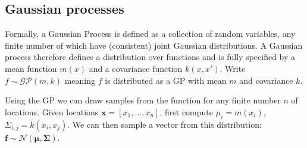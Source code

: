 \documentclass{article}
\begin{document}
\subsection{Gaussian processes}
Formally, a Gaussian Process is defined as a collection of random variables, any finite number of which have (consistent) joint Gaussian distributions. A Gaussian process therefore defines a distribution over functions and is fully specified by a mean function $m(x)$ and a covariance function $k(x, x')$. Write $f \sim \mathcal{GP}(m, k)$ meaning $f$ is distributed as a GP with mean $m$ and covariance $k$.

Using the GP we can draw samples from the function for any finite number $n$ of locations. Given locations $\mathbf{x} = [x_1, \dots, x_n]$, first compute $\mu_i = m(x_i)$, $\Sigma_{i,j} = k(x_i, x_j)$. We can then sample a vector from this distribution: $\mathbf{f} \sim \mathcal{N}(\mathbf{\mu}, \mathbf{\Sigma})$.
\end{document}
